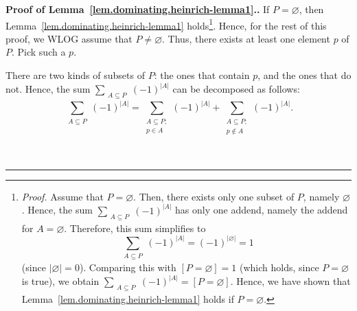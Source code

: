 \documentclass[numbers=enddot,12pt,final,onecolumn,notitlepage]{scrartcl}%
\theoremstyle{definition}
\newenvironment{proof}[1][Proof]{\noindent\textbf{#1.} }{\ \rule{0.5em}{0.5em}}
\let\sumnonlimits\sum
\renewcommand{\sum}{\sumnonlimits\limits}
\newcommand{\abs}[1]{\left| #1 \right|}
\newcommand{\tup}[1]{\left( #1 \right)}
\newcommand{\ive}[1]{\left[ #1 \right]}
\begin{document}
\begin{proof}[Proof of Lemma~\ref{lem.dominating.heinrich-lemma1}.]
If $P = \varnothing$, then Lemma~\ref{lem.dominating.heinrich-lemma1}
holds\footnote{\textit{Proof.} Assume that $P = \varnothing$. Then,
there exists only one subset of $P$, namely $\varnothing$. Hence,
the sum $\sum_{\substack{A \subseteq P}} \tup{-1}^{\abs{A}}$
has only one addend, namely the addend for $A = \varnothing$.
Therefore, this sum simplifies to
\[
\sum_{\substack{A \subseteq P}} \tup{-1}^{\abs{A}}
= \tup{-1}^{\abs{\varnothing}} = 1
\]
(since $\abs{\varnothing} = 0$). Comparing this with
$\ive{P = \varnothing} = 1$ (which holds, since $P = \varnothing$ is
true), we obtain
$\sum_{\substack{A \subseteq P}} \tup{-1}^{\abs{A}}
= \ive{P = \varnothing}$. Hence, we have shown that
Lemma~\ref{lem.dominating.heinrich-lemma1} holds if
$P = \varnothing$.}. Hence, for the rest of this proof, we WLOG
assume that $P \neq \varnothing$. Thus, there exists at least one
element $p$ of $P$. Pick such a $p$.

There are two kinds of subsets of $P$: the ones that contain $p$,
and the ones that do not. Hence, the sum
$\sum_{\substack{A \subseteq P}} \tup{-1}^{\abs{A}}$ can be
decomposed as follows:
\begin{equation}
\sum_{\substack{A \subseteq P}} \tup{-1}^{\abs{A}}
= \sum_{\substack{A \subseteq P; \\ p \in A}} \tup{-1}^{\abs{A}}
  + \sum_{\substack{A \subseteq P; \\ p \notin A}} \tup{-1}^{\abs{A}} .
\label{pf.lem.dominating.heinrich-lemma1.1}
\end{equation}


\end{proof}
\end{document}

